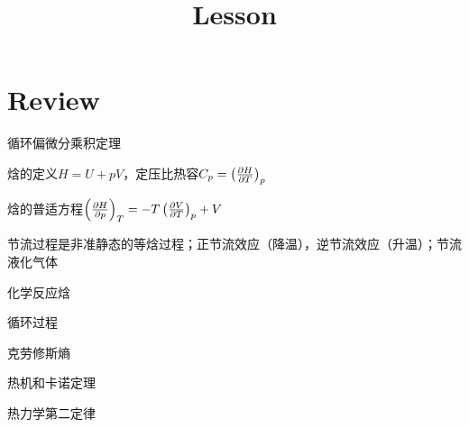 \documentclass[CJK]{beamer}
\title{Lesson }
\author{}
\date{}
\begin{document}
\tpage{}{}

\section{Review}

\begin{frame}
\bch 
\bitem
\item{循环偏微分乘积定理}
\item{焓的定义$H = U + pV$，定压比热容$C_p = \left(\frac{\partial H}{\partial T}\right)_{p}$}
\item{焓的普适方程$\left(\frac{\partial H}{\partial p}\right)_{T} = -T\left(\frac{\partial V}{\partial T}\right)_{p} + V$}
\item{节流过程是非准静态的等焓过程；正节流效应（降温），逆节流效应（升温）；节流液化气体}
\item{化学反应焓}
\eitem
\ech
\end{frame}

\begin{frame}
\bch
\bitem
\item{循环过程}
\item{克劳修斯熵}
\item{热机和卡诺定理}
\item{热力学第二定律}
\eitem
\ech
\end{frame}


\section{}

\begin{frame}
\chtitle{}
\bch
\ech
\end{frame}

\begin{frame}
\chtitle{}
\bch
\ech
\end{frame}

\begin{frame}
\chtitle{}
\bch
\ech
\end{frame}

\begin{frame}
\chtitle{}
\bch
\ech
\end{frame}

\begin{frame}
\chtitle{}
\bch
\ech
\end{frame}

\begin{frame}
\chtitle{}
\bch
\ech
\end{frame}
\end{document}
